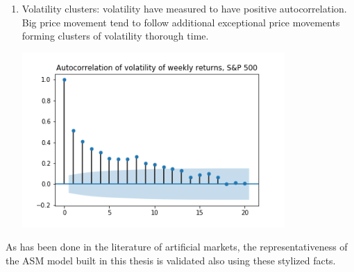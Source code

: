 \begin{enumerate}
    \item Volatility clusters: volatility have measured to have positive autocorrelation. Big price movement tend to follow additional exceptional price movements forming clusters of volatility thorough time.
    \par
    \begin{minipage}{\linewidth}
        \centering
        \includegraphics[width=10cm]{plots/S&P500_vola_autocorr.png}
        \label{fig:sp_volaclusters}
    \end{minipage}
\end{enumerate} 


As has been done in the literature of artificial markets, the 
representativeness of the ASM model built in this thesis is validated also 
using these stylized facts.
